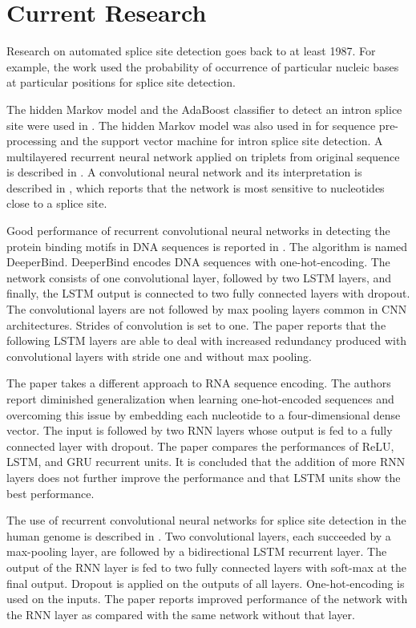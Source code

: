 \chapter{\label{ch:current-research}Current Research}

\minitoc

Research on automated splice site detection goes back to at least 1987. For
example, the work \cite{shapiro1987rna} used the probability of occurrence of
particular nucleic bases at particular positions for splice site detection.

The hidden Markov model and the AdaBoost classifier to detect an intron splice
site were used in \cite{pashaei2016novel}. The hidden Markov model was also
used in \cite{goel2015improved} for sequence pre-processing and the support
vector machine for intron splice site detection. A multilayered recurrent
neural network applied on triplets from original sequence is described in
\cite{sarkar2019splice}. A convolutional neural network and its interpretation
is described in \cite{zuallaert2018splicerover}, which reports that the network
is most sensitive to nucleotides close to a splice site.

Good performance of recurrent convolutional neural networks in detecting the
protein binding motifs in DNA sequences is reported in
\cite{hassanzadeh2016deeperbind}. The algorithm is named DeeperBind. DeeperBind
encodes DNA sequences with one-hot-encoding. The network consists of one
convolutional layer, followed by two LSTM layers, and finally, the LSTM output
is connected to two fully connected layers with dropout. The convolutional
layers are not followed by max pooling layers common in CNN architectures.
Strides of convolution is set to one. The paper reports that the following LSTM
layers are able to deal with increased redundancy produced with convolutional
layers with stride one and without max pooling.

The paper \cite{lee2015dna} takes a different approach to RNA sequence
encoding. The authors report diminished generalization when learning
one-hot-encoded sequences and overcoming this issue by embedding each
nucleotide to a four-dimensional dense vector. The input is followed by two RNN
layers whose output is fed to a fully connected layer with dropout. The paper
compares the performances of ReLU, LSTM, and GRU recurrent units. It is
concluded that the addition of more RNN layers does not further improve the
performance and that LSTM units show the best performance.

The use of recurrent convolutional neural networks for splice site detection in
the human genome is described in \cite{naito2018human}. Two convolutional
layers, each succeeded by a max-pooling layer, are followed by a bidirectional
LSTM recurrent layer. The output of the RNN layer is fed to two fully connected
layers with soft-max at the final output. Dropout is applied on the outputs of
all layers. One-hot-encoding is used on the inputs. The paper reports improved
performance of the network with the RNN layer as compared with the same network
without that layer.

